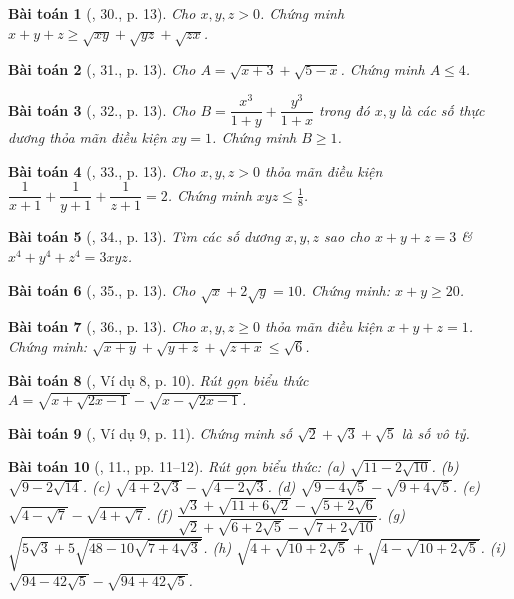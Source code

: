 \documentclass{article}
\newtheorem{baitoan}{Bài toán}
\begin{document}
\begin{baitoan}[\cite{Tuyen_Toan_9}, 30., p. 13]
	Cho $x,y,z > 0$. Chứng minh $x + y + z\ge\sqrt{xy} + \sqrt{yz} + \sqrt{zx}$.
\end{baitoan}

\begin{baitoan}[\cite{Tuyen_Toan_9}, 31., p. 13]
	Cho $A = \sqrt{x + 3} + \sqrt{5 - x}$. Chứng minh $A\le4$.
\end{baitoan}

\begin{baitoan}[\cite{Tuyen_Toan_9}, 32., p. 13]
	Cho $B = \dfrac{x^3}{1 + y} + \dfrac{y^3}{1 + x}$ trong đó $x,y$ là các số thực dương thỏa mãn điều kiện $xy = 1$. Chứng minh $B\ge1$.
\end{baitoan}

\begin{baitoan}[\cite{Tuyen_Toan_9}, 33., p. 13]
	Cho $x,y,z > 0$ thỏa mãn điều kiện $\dfrac{1}{x + 1} + \dfrac{1}{y + 1} + \dfrac{1}{z + 1} = 2$. Chứng minh $xyz\le\frac{1}{8}$.
\end{baitoan}

\begin{baitoan}[\cite{Tuyen_Toan_9}, 34., p. 13]
	Tìm các số dương $x,y,z$ sao cho $x + y + z = 3$ \& $x^4 + y^4 + z^4 = 3xyz$.
\end{baitoan}

\begin{baitoan}[\cite{Tuyen_Toan_9}, 35., p. 13]
	Cho $\sqrt{x} + 2\sqrt{y} = 10$. Chứng minh: $x + y\ge20$.
\end{baitoan}

\begin{baitoan}[\cite{Tuyen_Toan_9}, 36., p. 13]
	Cho $x,y,z\ge0$ thỏa mãn điều kiện $x + y + z = 1$. Chứng minh: $\sqrt{x + y} + \sqrt{y + z} + \sqrt{z + x}\le\sqrt{6}$.
\end{baitoan}

\begin{baitoan}[\cite{Binh_Toan_9_tap_1}, Ví dụ 8, p. 10]
	Rút gọn biểu thức $A = \sqrt{x + \sqrt{2x - 1}} - \sqrt{ x - \sqrt{2x - 1}}$.
\end{baitoan}

\begin{baitoan}[\cite{Binh_Toan_9_tap_1}, Ví dụ 9, p. 11]
	Chứng minh số $\sqrt{2} + \sqrt{3} + \sqrt{5}$ là số vô tỷ.
\end{baitoan}

\begin{baitoan}[\cite{Binh_Toan_9_tap_1}, 11., pp. 11--12]
	Rút gọn biểu thức: (a) $\sqrt{11 - 2\sqrt{10}}$. (b) $\sqrt{9 - 2\sqrt{14}}$. (c) $\sqrt{4 + 2\sqrt{3}} - \sqrt{4 - 2\sqrt{3}}$. (d) $\sqrt{9 - 4\sqrt{5}} - \sqrt{9 + 4\sqrt{5}}$. (e) $\sqrt{4 - \sqrt{7}} - \sqrt{4 + \sqrt{7}}$. (f) $\dfrac{\sqrt{3} + \sqrt{11 + 6\sqrt{2}}- \sqrt{5 + 2\sqrt{6}}}{\sqrt{2} + \sqrt{6 + 2\sqrt{5}} - \sqrt{7 + 2\sqrt{10}}}$. (g) $\sqrt{5\sqrt{3} + 5\sqrt{48 - 10\sqrt{7+ 4\sqrt{3}}}}$. (h) $\sqrt{4 + \sqrt{10 + 2\sqrt{5}}} + \sqrt{4 - \sqrt{10 + 2\sqrt{5}}}$. (i) $\sqrt{94 - 42\sqrt{5}} - \sqrt{94 + 42\sqrt{5}}$.
\end{baitoan}
\end{document}
